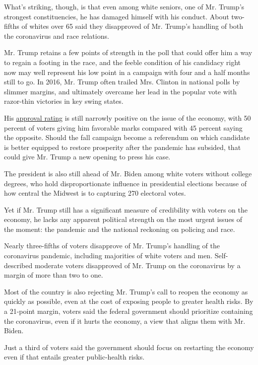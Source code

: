 What's striking, though, is that even among white seniors, one of Mr.
Trump's strongest constituencies, he has damaged himself with his
conduct. About two-fifths of whites over 65 said they disapproved of Mr.
Trump's handling of both the coronavirus and race relations.

Mr. Trump retains a few points of strength in the poll that could offer
him a way to regain a footing in the race, and the feeble condition of
his candidacy right now may well represent his low point in a campaign
with four and a half months still to go. In 2016, Mr. Trump often
trailed Mrs. Clinton in national polls by slimmer margins, and
ultimately overcame her lead in the popular vote with razor-thin
victories in key swing states.

His
\href{https://www.nytimes3xbfgragh.onion/2020/06/28/us/politics/trump-approval-older-voters-coronavirus.html}{approval
rating} is still narrowly positive on the issue of the economy, with 50
percent of voters giving him favorable marks compared with 45 percent
saying the opposite. Should the fall campaign become a referendum on
which candidate is better equipped to restore prosperity after the
pandemic has subsided, that could give Mr. Trump a new opening to press
his case.

The president is also still ahead of Mr. Biden among white voters
without college degrees, who hold disproportionate influence in
presidential elections because of how central the Midwest is to
capturing 270 electoral votes.

Yet if Mr. Trump still has a significant measure of credibility with
voters on the economy, he lacks any apparent political strength on the
most urgent issues of the moment: the pandemic and the national
reckoning on policing and race.

Nearly three-fifths of voters disapprove of Mr. Trump's handling of the
coronavirus pandemic, including majorities of white voters and men.
Self-described moderate voters disapproved of Mr. Trump on the
coronavirus by a margin of more than two to one.

Most of the country is also rejecting Mr. Trump's call to reopen the
economy as quickly as possible, even at the cost of exposing people to
greater health risks. By a 21-point margin, voters said the federal
government should prioritize containing the coronavirus, even if it
hurts the economy, a view that aligns them with Mr. Biden.

Just a third of voters said the government should focus on restarting
the economy even if that entails greater public-health risks.

